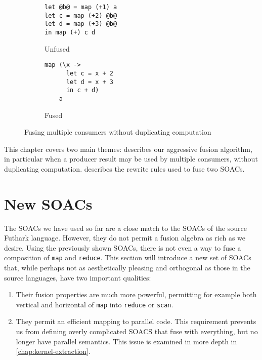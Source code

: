 \begin{figure}
\begin{subfigure}[t]{0.4\textwidth}
\begin{lstlisting}
let @b@ = map (+1) a
let c = map (+2) @b@
let d = map (+3) @b@
in map (+) c d
\end{lstlisting}
\caption{Unfused}
\end{subfigure}%
\hspace{.1\textwidth}
\begin{subfigure}[t]{0.4\textwidth}
\begin{lstlisting}
map (\x ->
      let c = x + 2
      let d = x + 3
      in c + d)
    a
\end{lstlisting}
\caption{Fused}
\end{subfigure}%
\caption{Fusing multiple consumers without duplicating computation}
\label{fig:fusion-multiple-consumers}
\end{figure}

This chapter covers two main themes: 
describes our aggressive fusion algorithm, in particular when a
producer result may be used by multiple consumers, without duplicating
computation.   describes the rewrite rules
used to fuse two SOACs.

\section{New SOACs}
\label{sec:fusion-in-futhark}

The SOACs we have used so far are a close match to the SOACs of the
source Futhark language.  However, they do not permit a fusion algebra
as rich as we desire.  Using the previously shown SOACs, there is not
even a way to fuse a composition of \lstinline{map} and
\lstinline{reduce}.  This section will introduce a new set of SOACs
that, while perhaps not as aesthetically pleasing and orthogonal as
those in the source languages, have two important qualities:

\begin{enumerate}
\item Their fusion properties are much more powerful, permitting for
  example both vertical and horizontal of \lstinline{map} into
  \lstinline{reduce} or \lstinline{scan}.
\item They permit an efficient mapping to parallel code.  This
  requirement prevents us from defining overly complicated SOACS that
  fuse with everything, but no longer have parallel semantics.  This
  issue is examined in more depth in \cref{chap:kernel-extraction}.
\end{enumerate}

